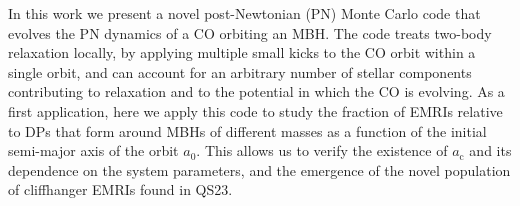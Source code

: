 \documentclass[desactivate]{aa}
\begin{document}
   
   In this work we present a novel post-Newtonian (PN) Monte Carlo code that evolves the PN dynamics of a CO orbiting an MBH. The code treats two-body relaxation locally, by applying multiple small kicks to the CO orbit within a single orbit, and can account for an arbitrary number of stellar components contributing to relaxation and to the potential in which the CO is evolving. As a first application, here we apply this code to study the fraction of EMRIs relative to DPs that form around MBHs of different masses as a function of the initial semi-major axis of the orbit $a_0$. This allows us to verify the existence of $a_\mathrm{c}$ and its dependence on the system parameters, and the emergence of the novel population of cliffhanger EMRIs found in QS23.
      


\end{document}
